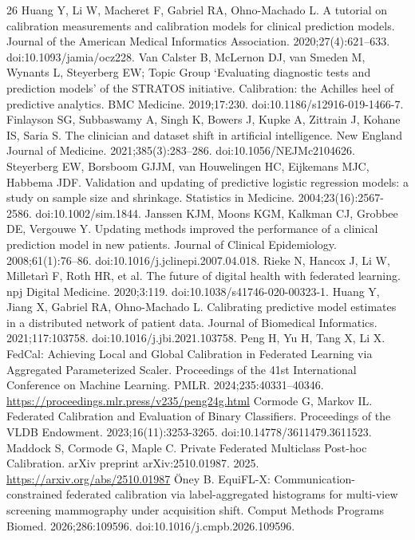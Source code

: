 \documentclass[11pt]{article}
\begin{document}
\begin{thebibliography}{26}
 Huang Y, Li W, Macheret F, Gabriel RA, Ohno-Machado L. A tutorial on calibration measurements and calibration models for clinical prediction models. Journal of the American Medical Informatics Association. 2020;27(4):621--633. doi:10.1093/jamia/ocz228.
 Van Calster B, McLernon DJ, van Smeden M, Wynants L, Steyerberg EW; Topic Group `Evaluating diagnostic tests and prediction models' of the STRATOS initiative. Calibration: the Achilles heel of predictive analytics. BMC Medicine. 2019;17:230. doi:10.1186/s12916-019-1466-7.
 Finlayson SG, Subbaswamy A, Singh K, Bowers J, Kupke A, Zittrain J, Kohane IS, Saria S. The clinician and dataset shift in artificial intelligence. New England Journal of Medicine. 2021;385(3):283--286. doi:10.1056/NEJMc2104626.
 Steyerberg EW, Borsboom GJJM, van Houwelingen HC, Eijkemans MJC, Habbema JDF. Validation and updating of predictive logistic regression models: a study on sample size and shrinkage. Statistics in Medicine. 2004;23(16):2567-2586. doi:10.1002/sim.1844.
 Janssen KJM, Moons KGM, Kalkman CJ, Grobbee DE, Vergouwe Y. Updating methods improved the performance of a clinical prediction model in new patients. Journal of Clinical Epidemiology. 2008;61(1):76--86. doi:10.1016/j.jclinepi.2007.04.018.
 Rieke N, Hancox J, Li W, Milletar{\`i} F, Roth HR, et al. The future of digital health with federated learning. npj Digital Medicine. 2020;3:119. doi:10.1038/s41746-020-00323-1.
 Huang Y, Jiang X, Gabriel RA, Ohno-Machado L. Calibrating predictive model estimates in a distributed network of patient data. Journal of Biomedical Informatics. 2021;117:103758. doi:10.1016/j.jbi.2021.103758.
 Peng H, Yu H, Tang X, Li X. FedCal: Achieving Local and Global Calibration in Federated Learning via Aggregated Parameterized Scaler. Proceedings of the 41st International Conference on Machine Learning. PMLR. 2024;235:40331--40346. \url{https://proceedings.mlr.press/v235/peng24g.html}
 Cormode G, Markov IL. Federated Calibration and Evaluation of Binary Classifiers. Proceedings of the VLDB Endowment. 2023;16(11):3253-3265. doi:10.14778/3611479.3611523.
 Maddock S, Cormode G, Maple C. Private Federated Multiclass Post-hoc Calibration. arXiv preprint arXiv:2510.01987. 2025. \url{https://arxiv.org/abs/2510.01987}
 {\"O}ney B. EquiFL-X: Communication-constrained federated calibration via label-aggregated histograms for multi-view screening mammography under acquisition shift. Comput Methods Programs Biomed. 2026;286:109596. doi:10.1016/j.cmpb.2026.109596.

\end{thebibliography}
\end{document}
